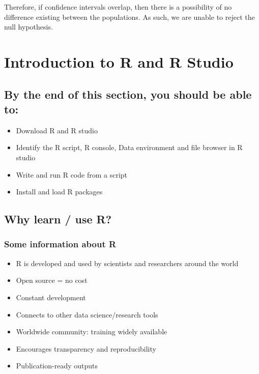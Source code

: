 \documentclass[
]{book}
\providecommand{\tightlist}{%
  \setlength{\itemsep}{0pt}\setlength{\parskip}{0pt}}
\begin{document}
Therefore, if confidence intervals overlap, then there is a possibility of no difference existing between the populations. As such, we are unable to reject the null hypothesis.

\hypertarget{introduction-to-r-and-r-studio}{%
\chapter{Introduction to R and R Studio}\label{introduction-to-r-and-r-studio}}

\hypertarget{by-the-end-of-this-section-you-should-be-able-to}{%
\section{By the end of this section, you should be able to:}\label{by-the-end-of-this-section-you-should-be-able-to}}

\begin{itemize}
\tightlist
\item
  Download R and R studio
\item
  Identify the R script, R console, Data environment and file browser in R studio
\item
  Write and run R code from a script
\item
  Install and load R packages
\end{itemize}

\hypertarget{why-learn-use-r}{%
\section{Why learn / use R?}\label{why-learn-use-r}}

\hypertarget{some-information-about-r}{%
\subsection{Some information about R}\label{some-information-about-r}}

\begin{itemize}
\tightlist
\item
  R is developed and used by scientists and researchers around the world
\item
  Open source = no cost
\item
  Constant development
\item
  Connects to other data science/research tools
\item
  Worldwide community: training widely available
\item
  Encourages transparency and reproducibility
\item
  Publication-ready outputs
\end{itemize}
\end{document}
